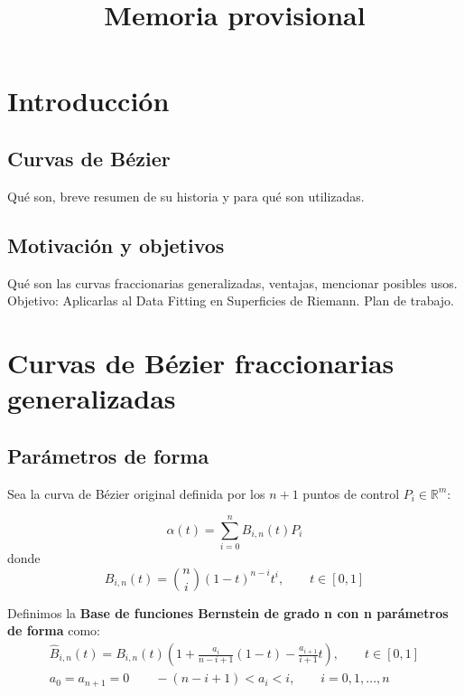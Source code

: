\documentclass{article}
\title{Memoria provisional}
\newcommand{\R}{\mathbb{R}}
\begin{document}
\maketitle

\section{Introducción}

\subsection{Curvas de Bézier}
Qué son, breve resumen de su historia y para qué son utilizadas.

\subsection{Motivación y objetivos}
Qué son las curvas fraccionarias generalizadas, ventajas, mencionar posibles usos. Objetivo: Aplicarlas al Data Fitting en Superficies de Riemann. Plan de trabajo.




\section{Curvas de Bézier fraccionarias generalizadas}

\subsection{Parámetros de forma}

Sea la curva de Bézier original definida por los $n+1$ puntos de control $P_i \in \R^m $:

\begin{equation*}
\alpha(t) = \sum_{i = 0}^{n}B_{i,n}(t)P_i
\end{equation*}
donde
\begin{equation*}
B_{i,n}(t) = \binom{n}{i}(1-t)^{n-i}t^i, \qquad  t\in[0,1]
\end{equation*}



Definimos la \textbf{Base de funciones Bernstein de grado n con n parámetros de forma} como:
\begin{gather*}
\hat{B}_{i,n}(t) = B_{i,n}(t)(1 + \frac{a_i}{n-i+1}(1-t) -\frac{a_{i+1}}{i+1}t), \qquad t\in[0,1] \\
a_0 = a_{n+1} = 0 \qquad -(n-i+1) < a_i < i, \qquad  i=0,1,...,n
\end{gather*}
\end{document}
